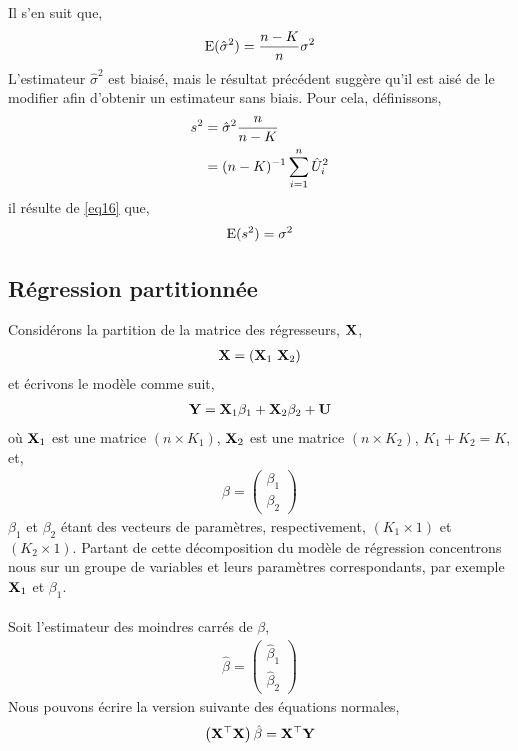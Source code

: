 Il s'en suit que,
\begin{align}
\operatorname{E}(\hat{\sigma}^2) = \frac{n-K}{n}\sigma^2
\label{eq16}
\end{align}
L'estimateur $\hat{\sigma}^2$ est biaisé, mais le résultat précédent suggère qu'il est aisé de le modifier afin d'obtenir un estimateur sans biais. Pour cela, définissons,
\begin{align*}
s^2 &= \hat{\sigma}^2\frac{n}{n-K}\\
&=(n-K)^{-1}\sum_{i=1}^n \hat{U}_i^2
\end{align*}
il résulte de \eqref{eq16} que, 
\begin{align*}
\operatorname{E}(s^2) = \sigma^2
\end{align*}

\subsection{Régression partitionnée}
Considérons la partition de la matrice des régresseurs, $\mathbf X$,
\begin{align*}
\mathbf X = \left(\mathbf X_1 \  \mathbf X_2\right)
\end{align*}
et écrivons le modèle comme suit,
\begin{align*}
\mathbf Y = \mathbf X_1\beta_1 + \mathbf X_2\beta_2 + \mathbf U
\end{align*}
où $\mathbf X_1$ est une matrice $(n\times K_1)$, $\mathbf X_2$ est une matrice $(n\times K_2)$, $K_1+K_2 = K$, et,
\begin{align*}
\beta = \left(
\begin{array}{c}
\beta_1\\
\beta_2
\end{array}
\right)
\end{align*}
$\beta_1$ et $\beta_2$ étant des vecteurs de paramètres, respectivement, $(K_1\times 1)$ et $(K_2\times 1)$. Partant de cette décomposition du modèle de régression concentrons nous sur un groupe de variables et leurs paramètres correspondants, par exemple $\mathbf X_1$ et $\beta_1$.\\\\
 Soit l'estimateur des moindres carrés de $\beta$,
\begin{align*}
\hat{\beta} = \left(
\begin{array}{c}
\hat{\beta}_1\\
\hat{\beta}_2
\end{array}
\right)
\end{align*}
Nous pouvons écrire la version suivante des équations normales,
\begin{align*}
\left(\mathbf X^\top\mathbf X\right)\hat{\beta}=\mathbf X^\top\mathbf Y
\end{align*}
